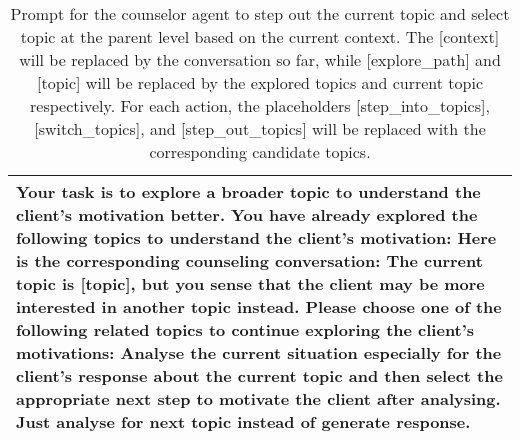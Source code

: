 \begin{table*}[tb]
\begin{tabularx}{\textwidth}{X}
\toprule
{\sf \footnotesize Your task is to explore a broader topic to understand the client's motivation better. \newline \newline You have already explored the following topics to understand the client’s motivation:  \newline Here is the corresponding counseling conversation: \newline [context] \newline \newline The current topic is [topic], but you sense that the client may be more interested in another topic instead. Please choose one of the following related topics to continue exploring the client’s motivations:  \newline \newline Analyse the current situation especially for the client's response about the current topic and then select the appropriate next step to motivate the client after analysing. Just analyse for next topic instead of generate response.}
\\ \bottomrule
\end{tabularx}
\caption{Prompt for the counselor agent to step out the current topic and select topic at the parent level based on the current context. The [context] will be replaced by the conversation so far, while [explore\_path] and [topic] will be replaced by the explored topics and current topic respectively. For each action, the placeholders [step\_into\_topics], [switch\_topics], and [step\_out\_topics] will be replaced with the corresponding candidate topics.}
\label{tab:topic step out}
\end{table*}

